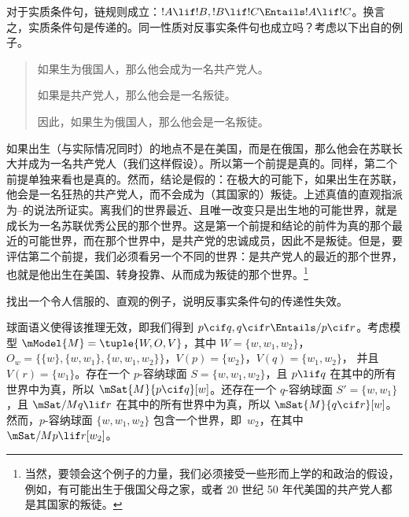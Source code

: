\documentclass[../../../include/open-logic-section]{subfiles}
\begin{document}


对于实质条件句，链规则成立：$!A \lif !B, !B
\lif !C \Entails !A \lif !C$。换言之，实质条件句是传递的。同一性质对反事实条件句也成立吗？考虑以下出自的例子。
\begin{quote}
  如果生为俄国人，那么他会成为一名共产党人。

  如果是共产党人，那么他会是一名叛徒。

  因此，如果生为俄国人，那么他会是一名叛徒。
\end{quote}
如果出生（与实际情况同时）的地点不是在美国，而是在俄国，那么他会在苏联长大并成为一名共产党人（我们这样假设）。所以第一个前提是真的。同样，第二个前提单独来看也是真的。然而，结论是假的：在极大的可能下，如果出生在苏联，他会是一名狂热的共产党人，而不会成为（其国家的）叛徒。上述真值的直观指派为--的说法所证实。离我们的世界最近、且唯一改变只是出生地的可能世界，就是成长为一名苏联优秀公民的那个世界。这是第一个前提和结论的前件为真的那个最近的可能世界，而在那个世界中，是共产党的忠诚成员，因此不是叛徒。但是，要评估第二个前提，我们必须看另一个不同的世界：是共产党人的最近的那个世界，也就是他出生在美国、转身投靠、从而成为叛徒的那个世界。\footnote{当然，要领会这个例子的力量，我们必须接受一些形而上学的和政治的假设，例如，有可能出生于俄国父母之家，或者 20 世纪 50 年代美国的共产党人都是其国家的叛徒。}

\begin{prob}
  找出一个令人信服的、直观的例子，说明反事实条件句的传递性失效。
\end{prob}

\begin{ex}
  球面语义使得该推理无效，即我们得到 $p
  \cif q, q \cif r \Entails/ p \cif r$。考虑模型 $\mModel{M}
  = \tuple{W, O, V}$，其中 $W = \{w, w_1, w_2\}$，$O_w = \{\{w\}, \{w,
  w_1\}, \{w, w_1, w_2\}\}$，$V(p) = \{w_2\}$，$V(q) = \{w_1, w_2\}$，
  并且 $V(r) = \{w_1\}$。存在一个 $p$-容纳球面 $S = \{w, w_1,
  w_2\}$，且 $p \lif q$ 在其中的所有世界中为真，所以 $\mSat{M}{p
    \cif q}[w]$。还存在一个 $q$-容纳球面 $S' = \{w,
  w_1\}$，且 $\mSat/{M}{q \lif r}$ 在其中的所有世界中为真，所以
  $\mSat{M}{q \cif r}[w]$。然而，$p$-容纳球面 $\{w,
  w_1, w_2\}$ 包含一个世界，即~$w_2$，在其中 $\mSat/{M}{p \lif
    r}[w_2]$。
\end{ex}
\end{document}
